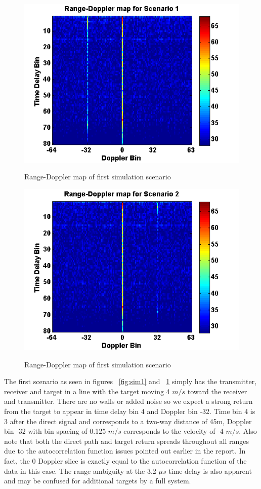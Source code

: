 \documentclass[article,11pt,onecolumn,final]{IEEEtran}
\begin{document}
\begin{figure}[H]
	\caption{Range-Doppler map of first simulation scenario}
	\centering
	\includegraphics[width=400pt]{figures/rdm1.png}
	\label{fig:rdm1}
\end{figure}

\begin{figure}[H]
	\caption{Range-Doppler map of first simulation scenario}
	\centering
	\includegraphics[width=400pt]{figures/rdm2.png}
	\label{fig:rdm2}
\end{figure}

The first scenario as seen in figures ~\ref{fig:sim1} and ~\ref{fig:rdm1} simply has the transmitter, receiver and target in a line with the target moving 4 $m/s$ toward the receiver and transmitter. There are no walls or added noise so we expect a strong return from the target to appear in time delay bin 4 and Doppler bin -32. Time bin 4 is 3 after the direct signal and corresponds to a two-way distance of 45m, Doppler bin -32 with bin spacing of 0.125 $m/s$ corresponds to the velocity of -4 $m/s$. Also note that both the direct path and target return spreads throughout all ranges due to the autocorrelation function issues pointed out earlier in the report. In fact, the 0 Doppler slice is exactly equal to the autocorrelation function of the data in this case. The range ambiguity at the 3.2 $\mu s$ time delay is also apparent and may be confused for additional targets by a full system.
\end{document}

